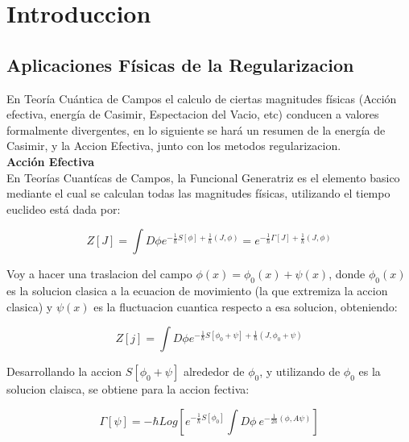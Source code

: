 \chapter{Introduccion}


\section{Aplicaciones Físicas de la Regularizacion}

En Teoría Cuántica de Campos el calculo de ciertas magnitudes físicas (Acción efectiva, energía de Casimir, Espectacion del Vacio, etc) conducen a valores formalmente divergentes, en lo siguiente se hará un resumen de la energía de Casimir, y la Accion Efectiva, junto con los metodos regularizacion.\\





\textbf{Acción Efectiva}\\


En Teorías Cuantícas de Campos, la Funcional Generatriz es el elemento basico mediante el cual se calculan todas las magnitudes físicas, utilizando el tiempo euclideo está dada por:

\begin{equation}
Z[J] = 
\int D \phi
e^{-\frac{1}{\hbar} S[\phi] + \frac{1}{\hbar} (J,\phi) }  =
e ^{-\frac{1}{\hbar} \Gamma[J] + \frac{1}{\hbar} (J,\phi )}
\end{equation}

Voy a hacer una traslacion del campo $\phi (x) = \phi _0 (x) + \psi (x) $, donde $\phi _0 (x)$ es la solucion clasica a la ecuacion de movimiento (la que extremiza la accion clasica) y $\psi (x)$ es la fluctuacion cuantica respecto a esa solucion, obteniendo:

\begin{equation}
Z[j] = 
\int D \phi
e^{-\frac{1}{\hbar} S[\phi _0 + \psi] + \frac{1}{\hbar} (J,\phi _0 + \psi ) }  
\end{equation}

Desarrollando la accion $S[\phi _0 + \psi]$ alrededor de $\phi _0$, y utilizando de $\phi _0$ es la solucion claisca, se obtiene para la accion fectiva:

\begin{equation}
\Gamma [\psi] = 
- \hbar 
Log
\left[
	e ^{-\frac{1}{\hbar} S[\phi _0] }
	\int D \phi \
	e ^{-\frac{1}{2 \hbar} (\phi,A \psi) }
	\right]
\end{equation}



